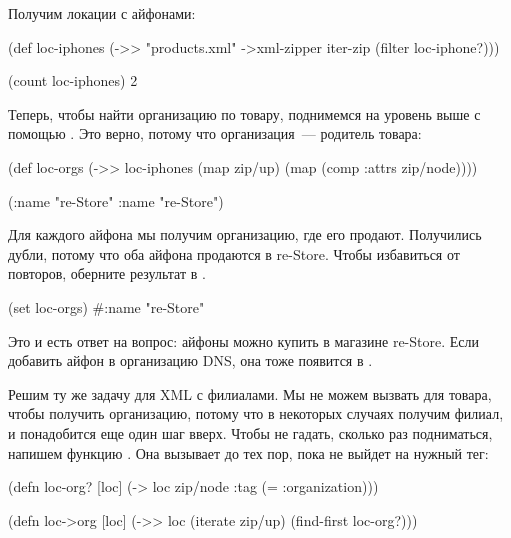 Получим локации с айфонами:

\begin{english}
  \begin{clojure}
(def loc-iphones
  (->> "products.xml"
       ->xml-zipper
       iter-zip
       (filter loc-iphone?)))

(count loc-iphones)
2
  \end{clojure}
\end{english}

Теперь, чтобы найти организацию по товару, поднимемся на уровень выше с помощью
. Это верно, потому что организация~--- родитель товара:

\begin{english}
  \begin{clojure}
(def loc-orgs
  (->> loc-iphones
       (map zip/up)
       (map (comp :attrs zip/node))))

({:name "re-Store"}
 {:name "re-Store"})
  \end{clojure}
\end{english}

Для каждого айфона мы получим организацию, где его продают. Получились дубли,
потому что оба айфона продаются в re-Store. Чтобы избавиться от повторов,
оберните результат в .

\begin{english}
  \begin{clojure}
(set loc-orgs)
#{{:name "re-Store"}}
  \end{clojure}
\end{english}

Это и есть ответ на вопрос: айфоны можно купить в магазине re-Store. Если
добавить айфон в организацию DNS, она тоже появится в .

Решим ту же задачу для XML с филиалами. Мы не можем вызвать  для товара,
чтобы получить организацию, потому что в некоторых случаях получим филиал, и
понадобится еще один шаг вверх. Чтобы не гадать, сколько раз подниматься,
напишем функцию . Она вызывает  до тех пор, пока не выйдет на
нужный тег:

\begin{english}
  \begin{clojure}
(defn loc-org? [loc]
  (-> loc zip/node :tag (= :organization)))

(defn loc->org [loc]
  (->> loc
       (iterate zip/up)
       (find-first loc-org?)))
  \end{clojure}
\end{english}

